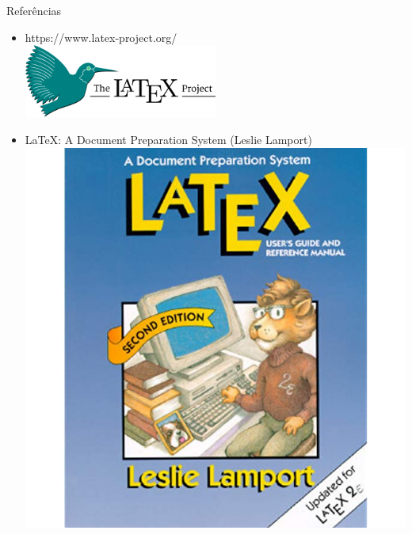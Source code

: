 \documentclass{beamer}
\begin{document}
\begin{frame}{Referências}
	
	
			\begin{itemize}
				\item https://www.latex-project.org/ \\
				\includegraphics[width=0.5\textwidth]{latex-project-logo.png}
				
				
				\item LaTeX: A Document Preparation System (Leslie Lamport) \\
				\includegraphics[scale=0.2]{livro.png}
				
			\end{itemize}

	
	
\end{frame}
\end{document}

